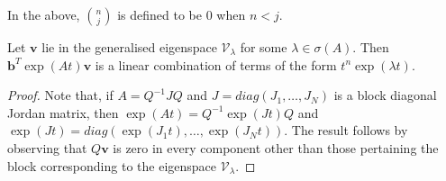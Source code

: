 
In the above, ${n\choose j}$ is defined to be $0$ when $n<j$.

\begin{proposition}
  Let $\boldsymbol{v}$ lie in the generalised eigenspace
  $\mathcal{V}_{\lambda}$ for some $\lambda \in \sigma(A)$.  Then
  $\boldsymbol{b}^{T}\exp(At)\boldsymbol{v}$ is a linear combination
  of terms of the form $t^{n}\exp(\lambda t)$.
\label{prop:linear}
\end{proposition}

\begin{proof}
  Note that, if $A=Q^{-1}JQ$ and $J=diag(J_{1},\ldots,J_{N})$ is a
  block diagonal Jordan matrix, then $\exp(At)=Q^{-1}\exp(Jt)Q$ and
  $\exp(Jt)=diag(\exp(J_{1}t),\ldots,\exp(J_{N}t))$.
The result follows by observing that $Q\boldsymbol{v}$ is zero in every component
other than those pertaining the block corresponding to the eigenspace
$\mathcal{V}_{\lambda}$.
\end{proof}
